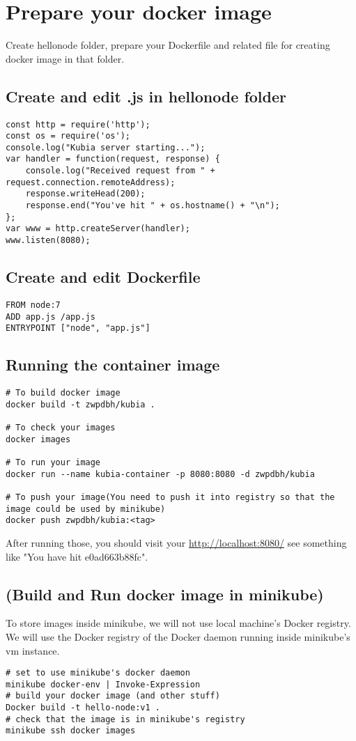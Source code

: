 \documentclass[11pt]{article}
\begin{document}
\section{Prepare your docker image}
\label{sec:org03efc49}
Create hellonode folder, prepare your Dockerfile and related file for creating docker image in that folder.
\subsection{Create and edit .js in hellonode folder}
\label{sec:org26f8599}
\begin{verbatim}
const http = require('http');
const os = require('os');
console.log("Kubia server starting...");
var handler = function(request, response) {
    console.log("Received request from " + request.connection.remoteAddress);
    response.writeHead(200);
    response.end("You've hit " + os.hostname() + "\n");
};
var www = http.createServer(handler);
www.listen(8080);
\end{verbatim}
\subsection{Create and edit Dockerfile}
\label{sec:org114364d}
\begin{verbatim}
FROM node:7
ADD app.js /app.js
ENTRYPOINT ["node", "app.js"]
\end{verbatim}
\subsection{Running the container image}
\label{sec:org78a0b1d}
\begin{verbatim}
# To build docker image
docker build -t zwpdbh/kubia .

# To check your images
docker images

# To run your image
docker run --name kubia-container -p 8080:8080 -d zwpdbh/kubia

# To push your image(You need to push it into registry so that the image could be used by minikube)
docker push zwpdbh/kubia:<tag>
\end{verbatim}
After running those, you should visit your \href{http://localhost:8080/}{http://localhost:8080/} see something like "You have hit e0ad663b88fc".

\subsection{(Build and Run docker image in minikube)}
\label{sec:org5785282}
To store images inside minikube, we will not use local machine's Docker registry. We will use the Docker registry of the Docker daemon running inside minikube's vm instance.
\begin{verbatim}
# set to use minikube's docker daemon
minikube docker-env | Invoke-Expression
# build your docker image (and other stuff)
Docker build -t hello-node:v1 .
# check that the image is in minikube's registry
minikube ssh docker images
\end{verbatim}
\end{document}
